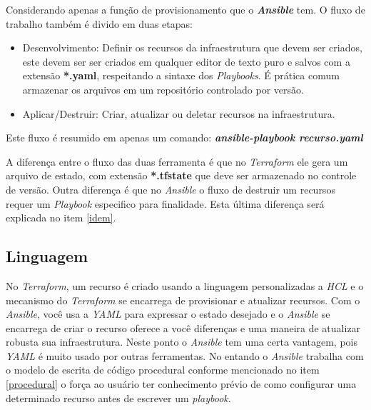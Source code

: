 Considerando apenas a função de provisionamento que o \textbf{\textit{Ansible}} tem. O fluxo de trabalho também é divido em duas etapas:

\begin{itemize}
  \item Desenvolvimento: Definir os recursos da infraestrutura que devem ser criados, este devem ser ser criados em qualquer editor de texto puro e salvos com a extensão \textbf{*.yaml}, respeitando a sintaxe dos \textit{Playbooks}. É prática comum armazenar os arquivos em um repositório controlado por versão.
  \item Aplicar/Destruir: Criar, atualizar ou deletar recursos na infraestrutura. 
\end{itemize}


Este fluxo é resumido em apenas um comando: \textbf{\textit{ansible-playbook recurso.yaml}}


A diferença entre o fluxo das duas ferramenta é que no \textit{Terraform} ele gera um arquivo de estado, com extensão \textbf{*.tfstate} que deve ser armazenado no controle de versão. Outra diferença é que no \textit{Ansible} o fluxo de destruir um recursos requer um \textit{Playbook} especifico para finalidade. Esta última diferença será explicada no item \ref{idem}.  


\subsection{Linguagem}

No \textit{Terraform}, um recurso é criado usando a linguagem personalizadas a \textit{HCL} e o mecanismo do \textit{Terraform} se encarrega de provisionar e atualizar recursos. Com o \textit{Ansible}, você usa a \textit{YAML} para expressar o estado desejado e o \textit{Ansible} se encarrega de criar o recurso oferece a você diferenças e uma maneira de atualizar robusta sua infraestrutura. Neste ponto o \textit{Ansible} tem uma certa vantagem, pois \textit{YAML} é muito usado por outras ferramentas.  No entando o \textit{Ansible} trabalha com o modelo de escrita de código procedural conforme mencionado no item \ref{procedural} o força ao usuário ter conhecimento prévio de como configurar uma determinado recurso antes de escrever um \textit{playbook}. 

